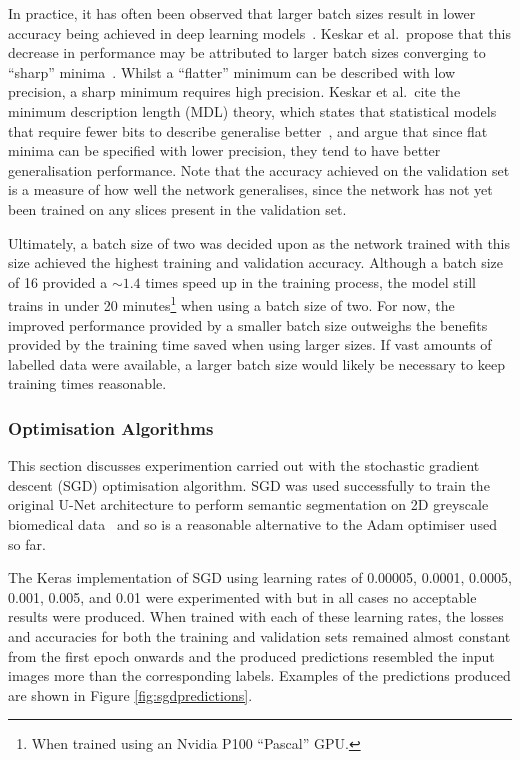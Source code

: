 In practice, it has often been observed that larger batch sizes result in lower accuracy being achieved in deep learning models~\cite{keskar2016large, smallbatch, largebatch}. Keskar et al.\ propose that this decrease in performance may be attributed to larger batch sizes converging to ``sharp'' minima~\cite{keskar2016large}. Whilst a ``flatter'' minimum can be described with low precision, a sharp minimum requires high precision. Keskar et al.\ cite the minimum description length (MDL) theory, which states that statistical models that require fewer bits to describe generalise better~\cite{rissanen}, and argue that since flat minima can be specified with lower precision, they tend to have better generalisation performance. Note that the accuracy achieved on the validation set is a measure of how well the network generalises, since the network has not yet been trained on any slices present in the validation set.

Ultimately, a batch size of two was decided upon as the network trained with this size achieved the highest training and validation accuracy. Although a batch size of 16 provided a ${\sim}1.4$ times speed up in the training process, the model still trains in under 20 minutes\footnote{When trained using an Nvidia P100 ``Pascal'' GPU.} when using a batch size of two. For now, the improved performance provided by a smaller batch size outweighs the benefits provided by the training time saved when using larger sizes. If vast amounts of labelled data were available, a larger batch size would likely be necessary to keep training times reasonable.

\subsubsection{Optimisation Algorithms}

This section discusses experimention carried out with the stochastic gradient descent (SGD) optimisation algorithm. SGD was used successfully to train the original U-Net architecture to perform semantic segmentation on 2D greyscale biomedical data~\cite{ronneberger2015u} and so is a reasonable alternative to the Adam optimiser used so far.

The Keras implementation of SGD using learning rates of 0.00005, 0.0001, 0.0005, 0.001, 0.005, and 0.01 were experimented with but in all cases no acceptable results were produced. When trained with each of these learning rates, the losses and accuracies for both the training and validation sets remained almost constant from the first epoch onwards and the produced predictions resembled the input images more than the corresponding labels. Examples of the predictions produced are shown in Figure \ref{fig:sgdpredictions}.

